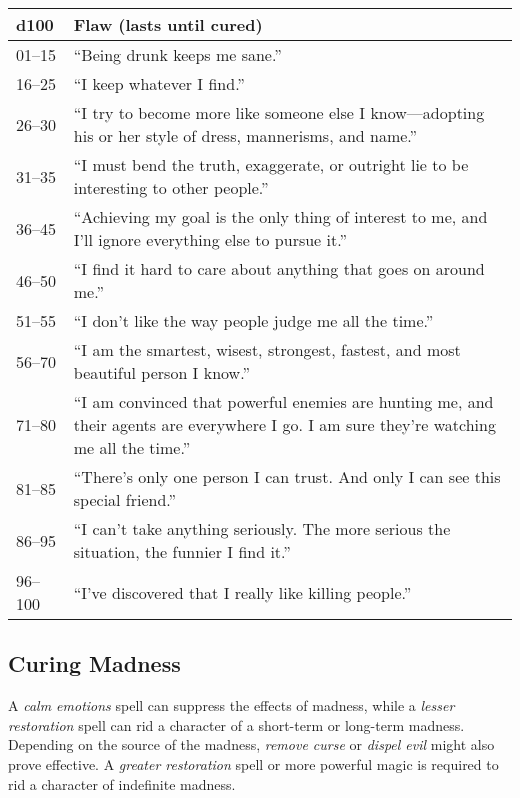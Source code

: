 \documentclass[
]{article}
\begin{document}
\begin{longtable}[]{@{}ll@{}}
\toprule
d100 & Flaw (lasts until cured)\tabularnewline
\midrule
\endhead
01--15 & ``Being drunk keeps me sane.''\tabularnewline
16--25 & ``I keep whatever I find.''\tabularnewline
26--30 & ``I try to become more like someone else I know---adopting his
or her style of dress, mannerisms, and name.''\tabularnewline
31--35 & ``I must bend the truth, exaggerate, or outright lie to be
interesting to other people.''\tabularnewline
36--45 & ``Achieving my goal is the only thing of interest to me, and
I'll ignore everything else to pursue it.''\tabularnewline
46--50 & ``I find it hard to care about anything that goes on around
me.''\tabularnewline
51--55 & ``I don't like the way people judge me all the
time.''\tabularnewline
56--70 & ``I am the smartest, wisest, strongest, fastest, and most
beautiful person I know.''\tabularnewline
71--80 & ``I am convinced that powerful enemies are hunting me, and
their agents are everywhere I go. I am sure they're watching me all the
time.''\tabularnewline
81--85 & ``There's only one person I can trust. And only I can see this
special friend.''\tabularnewline
86--95 & ``I can't take anything seriously. The more serious the
situation, the funnier I find it.''\tabularnewline
96--100 & ``I've discovered that I really like killing
people.''\tabularnewline
\bottomrule
\end{longtable}

\hypertarget{curing-madness}{%
\subsection{Curing Madness}\label{curing-madness}}

A \emph{calm emotions} spell can suppress the effects of madness, while
a \emph{lesser restoration} spell can rid a character of a short-term or
long-term madness. Depending on the source of the madness, \emph{remove
curse} or \emph{dispel evil} might also prove effective. A \emph{greater
restoration} spell or more powerful magic is required to rid a character
of indefinite madness.
\end{document}
